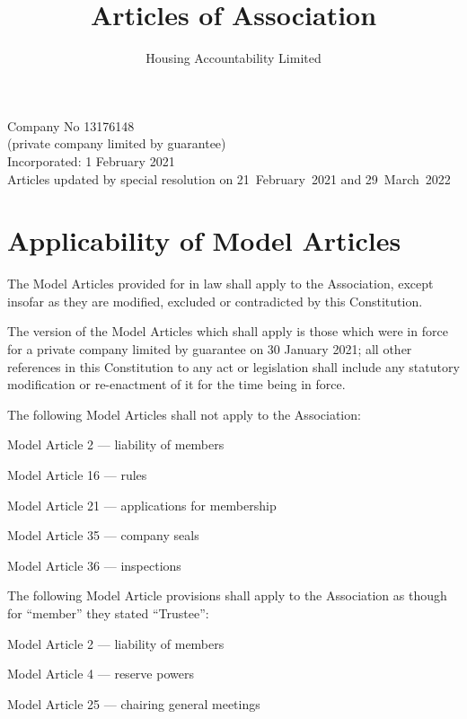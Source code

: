 \documentclass[10pt]{mk-articles-of-association}
\newcommand{\Name}[0]{Housing Accountability Limited}
\begin{document}
\title{
Articles of Association\\
}
\author{\Name{}\\
}
\date{}

\maketitle

\begin{center}
Company No 13176148\\
(private company limited by guarantee)\\
\medskip
Incorporated: 1 February 2021 \\
\medskip
Articles updated by special resolution on 21~February~2021 and 29~March~2022
\end{center}



\section{Applicability of Model Articles}

\begin{constenum}

\item The Model Articles provided for in law shall apply to the
  Association, except insofar as they are modified, excluded or
  contradicted by this Constitution.

\item The version of the Model Articles which shall apply is those
  which were in force for a private company limited by guarantee on
  30 January 2021; all other references in this Constitution
  to any act or legislation shall include any statutory modification
  or re-enactment of it for the time being in force.

\item The following Model Articles shall not apply to the Association:
  \begin{constenum}
  \item Model Article 2 --- liability of members
  \item Model Article 16 --- rules
  \item Model Article 21 --- applications for membership
  \item Model Article 35 --- company seals
  \item Model Article 36 --- inspections
  \end{constenum}

\item The following Model Article provisions shall apply to the Association
  as though for ``member'' they stated ``Trustee'':

  \begin{constenum}
  \item Model Article 2 --- liability of members
  \item Model Article 4 --- reserve powers
  \item Model Article 25 --- chairing general meetings
  \end{constenum}

\end{constenum}
\end{document}
